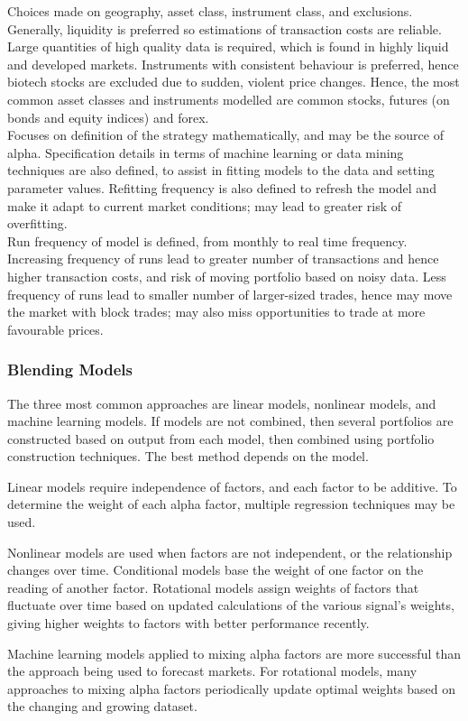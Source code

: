  Choices made on geography, asset class, instrument class, and exclusions. Generally, liquidity is preferred so estimations of transaction costs are reliable. Large quantities of high quality data is required, which is found in highly liquid and developed markets. Instruments with consistent behaviour is preferred, hence biotech stocks are excluded due to sudden, violent price changes. Hence, the most common asset classes and instruments modelled are common stocks, futures (on bonds and equity indices) and forex.\\

 Focuses on definition of the strategy mathematically, and may be the source of alpha. Specification details in terms of machine learning or data mining techniques are also defined, to assist in fitting models to the data and setting parameter values. Refitting frequency is also defined to refresh the model and make it adapt to current market conditions; may lead to greater risk of overfitting.\\

 Run frequency of model is defined, from monthly to real time frequency. Increasing frequency of runs lead to greater number of transactions and hence higher transaction costs, and risk of moving portfolio based on noisy data. Less frequency of runs lead to smaller number of larger-sized trades, hence may move the market with block trades; may also miss opportunities to trade at more favourable prices.

\subsubsection{Blending Models}

The three most common approaches are linear models, nonlinear models, and machine learning models. If models are not combined, then several portfolios are constructed based on output from each model, then combined using portfolio construction techniques. The best method depends on the model.

Linear models require independence of factors, and each factor to be additive. To determine the weight of each alpha factor, multiple regression techniques may be used.

Nonlinear models are used when factors are not independent, or the relationship changes over time. Conditional models base the weight of one factor on the reading of another factor. Rotational models assign weights of factors that fluctuate over time based on updated calculations of the various signal's weights, giving higher weights to factors with better performance recently.

Machine learning models applied to mixing alpha factors are more successful than the approach being used to forecast markets. For rotational models, many approaches to mixing alpha factors periodically update optimal weights based on the changing and growing dataset.



